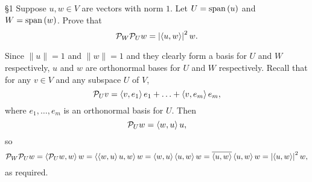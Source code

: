\documentclass{homework}
\begin{document}
\begin{problem}{\S 1}
  Suppose $u,w\in V$ are vectors with norm $1$. Let $U=\operatorname{span}{(u)}$ and $W=\operatorname{span}{(w)}$. Prove that \[
    \mathcal{P}_W\mathcal{P}_Uw=\left| \left<u,w \right>  \right| ^2w
  .\] 
\end{problem}

\begin{solution}
  Since $\|u\|=1$ and $\|w\|=1$ and they clearly form a basis for $U$ and $W$ respectively, $u$ and
  $w$ are orthonormal bases for $U$ and $W$ respectively. Recall that for any $v\in V$ and any
  subspace $U$ of $V$, \[
    \mathcal{P}_Uv=\left<v,e_1 \right> e_1+\ldots+\left<v,e_m \right> e_m
  ,\] where $e_1,\ldots,e_m$ is an orthonormal basis for $U$. Then \[
    \mathcal{P}_Uw=\left<w,u \right> u
  ,\] so \[
    \mathcal{P}_W\mathcal{P}_Uw=\left<\mathcal{P}_Uw,w \right>w =\left<\left<w,u \right> u,w \right> w=\left<w,u
    \right> \left<u,w \right>w =\overline{\left<u,w \right> }\left<u,w \right>w=\left| \left<u,w
    \right>  \right| ^2w
  ,\] as required.
\end{solution}
\end{document}
